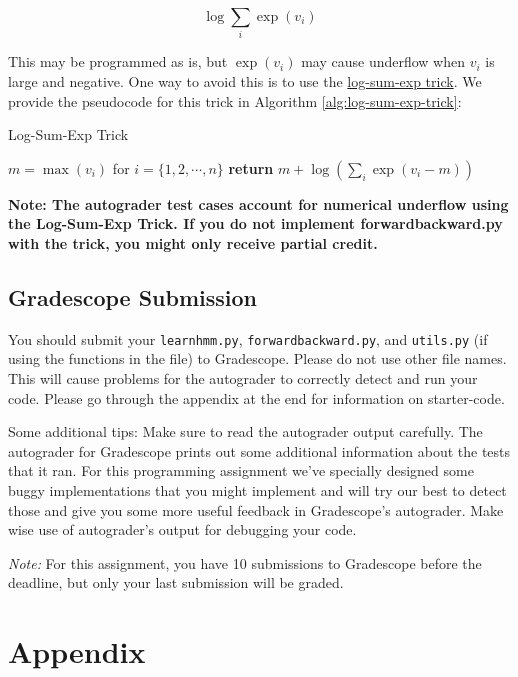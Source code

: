 \documentclass[11pt,addpoints,answers]{exam}
\begin{document}
$$ \log \sum_i \exp{(v_i)}$$

This may be programmed as is, but $\exp{(v_i)}$ may cause underflow when $v_i$ is large and negative. One way to avoid this is to use the \href{https://www.xarg.org/2016/06/the-log-sum-exp-trick-in-machine-learning/}{log-sum-exp trick}. We provide the pseudocode for this trick in Algorithm \ref{alg:log-sum-exp-trick}:

\begin{algorithm}[H]
    \caption{Log-Sum-Exp Trick}
    \label{alg:log-sum-exp-trick}
    \begin{algorithmic}[1]
            \State $m = \max(v_i)$ for $i=\{1, 2,\cdots, n\}$ 
            \State \textbf{return }{$m + \log(\sum_i\exp(v_i-m))$} 
        \EndProcedure
    \end{algorithmic}
\end{algorithm}

\textbf{Note: The autograder test cases account for numerical underflow using the Log-Sum-Exp Trick. If you do not implement \textbf{forwardbackward.py} with the trick, you might only receive partial credit.}

\subsection{Gradescope Submission}

You should submit your \texttt{learnhmm.py}, \texttt{forwardbackward.py}, and \texttt{utils.py} (if using the functions in the file) to Gradescope. Please do not use other file names. This will cause problems for the autograder to correctly detect and run your code. Please go through the appendix at the end for information on starter-code.

Some additional tips: 
Make sure to read the autograder output carefully. The autograder for Gradescope prints out some additional 
information about the tests that it ran. For this programming assignment we’ve specially designed some buggy implementations that you might implement and will try our best to detect those and give you some more useful feedback in Gradescope’s autograder. Make wise use of autograder’s output for debugging your code.


\textit{Note:} For this assignment, you have 10 submissions to Gradescope before the deadline, but only your last submission will be graded.
\newpage
\section{Appendix}
\end{document}
